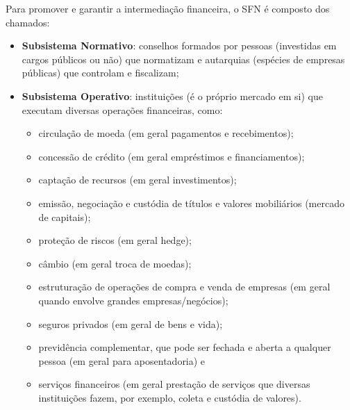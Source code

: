 \documentclass{article}\usepackage[]{graphicx}\usepackage[]{xcolor}
\begin{document}
Para promover e garantir a intermediação financeira, o SFN é composto dos chamados:

\begin{itemize}
  \item \textbf{Subsistema Normativo}: conselhos formados por pessoas (investidas em cargos públicos ou não)
        que normatizam e autarquias (espécies de empresas públicas) que controlam e fiscalizam;

  \item \textbf{Subsistema Operativo}: instituições (é o próprio mercado em si) que executam diversas
        operações financeiras, como:

        \begin{itemize}

          \item circulação de moeda (em geral pagamentos e recebimentos);

          \item concessão de crédito (em geral empréstimos e financiamentos);

          \item captação de recursos (em geral investimentos);

          \item emissão, negociação e custódia de títulos e valores mobiliários (mercado de capitais);

          \item proteção de riscos (em geral hedge);

          \item câmbio (em geral troca de moedas);

          \item estruturação de operações de compra e venda de empresas (em geral quando envolve grandes empresas/negócios);

          \item seguros privados (em geral de bens e vida);

          \item previdência complementar, que pode ser fechada e aberta a qualquer pessoa (em geral para aposentadoria)  e

          \item serviços financeiros (em geral prestação de serviços que diversas instituições fazem, por exemplo,
                coleta e custódia de valores).

        \end{itemize}

\end{itemize}
\end{document}
